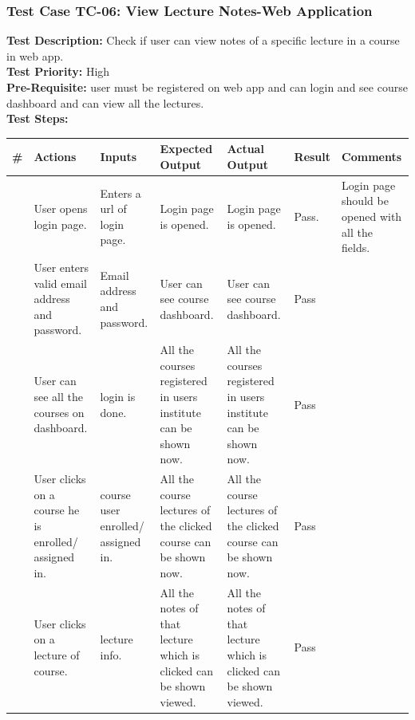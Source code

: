 \documentclass[12pt]{article}
\begin{document}
\subsubsection{Test Case TC-06: View Lecture Notes-Web Application}
\textbf{Test Description: } Check if user can view notes of a specific lecture in a course in web app. \\
\textbf{Test Priority: } High \\
\textbf{Pre-Requisite: } user must be registered on web app and can login and see course dashboard and can view all the lectures. \\
\textbf{Test Steps: }
\begin{longtable}{ |>{\raggedright\arraybackslash} p{0.7cm} | >{\raggedright\arraybackslash}p{2cm}|>{\raggedright\arraybackslash} p{2cm} |>{\raggedright\arraybackslash} p{2.5cm} |>{\raggedright\arraybackslash} p{2.5cm} |>{\raggedright\arraybackslash} p{1.3cm} |>{\raggedright\arraybackslash} p{2.5cm} | } 
\hline
\textbf{\#}
& \textbf{Actions} 
& \textbf{Inputs}
& \textbf{Expected Output} 
& \textbf{Actual Output} 
& \textbf{Result} 
& \textbf{Comments} 
\\ 
\hline
1
& User opens login page. 
& Enters a url of login page.
& Login page is opened.
& Login page is opened.
& Pass.
& Login page should be opened with all the fields.
\\ 
\hline
2 
& User enters valid email address and password.
& Email address and password.
& User can see course dashboard.
& User can see course dashboard. 
& Pass
&  
\\ 
\hline
3
& User can see all the courses on dashboard.
& login is done.
& All the courses registered in users institute can be shown now.
& All the courses registered in users institute can be shown now. 
& Pass
&  
\\ 
\hline
4
& User clicks on a course he is enrolled/ assigned in.
& course user enrolled/ assigned in.
& All the course lectures of the clicked course can be shown now.
& All the course lectures of the clicked course can be shown now. 
& Pass
&  
\\ 
\hline
5
& User clicks on a lecture of course.
& lecture info.
& All the notes of that lecture which is clicked can be shown viewed.
& All the notes of that lecture which is clicked can be shown viewed. 
& Pass
&  
\\ 
\hline

\end{longtable}

\newpage
\end{document}
